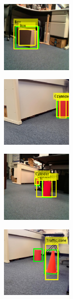 \begin{figure}
    \centering
    \begin{subfigure}[]
        \centering
        \includegraphics[width=0.38\textwidth]{Images/ft1.png}
    \end{subfigure}
    \begin{subfigure}[]
        \centering
        \includegraphics[width=0.38\textwidth]{Images/ft2.png}
    \end{subfigure}
    \begin{subfigure}[]
        \centering
        \includegraphics[width=0.38\textwidth]{Images/ft3.png}
    \end{subfigure}
    \begin{subfigure}[]
        \centering
        \includegraphics[width=0.38\textwidth]{Images/ft4.png}

\end{subfigure}
\end{figure}
